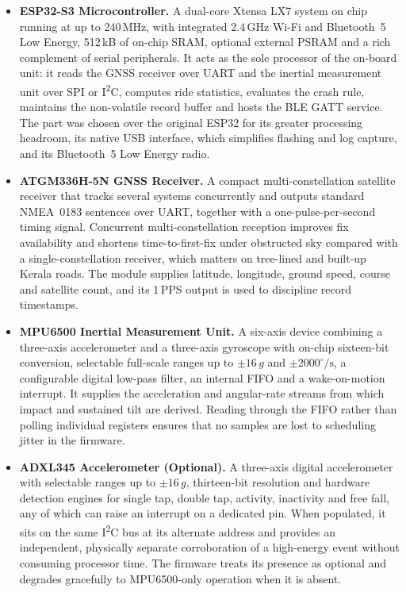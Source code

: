 \documentclass[12pt,a4paper,oneside]{report}
\newcommand{\SI}[2]{#1\,#2}
\begin{document}
\begin{itemize}[leftmargin=*,itemsep=0.6em,topsep=0.6em]
\item \textbf{ESP32-S3 Microcontroller.} A dual-core Xtensa LX7 system on chip running at up
to \SI{240}{MHz}, with integrated \SI{2.4}{GHz} Wi-Fi and Bluetooth~5 Low Energy, \SI{512}{kB}
of on-chip SRAM, optional external PSRAM and a rich complement of serial peripherals. It
acts as the sole processor of the on-board unit: it reads the GNSS receiver over UART and the
inertial measurement unit over SPI or I\textsuperscript{2}C, computes ride statistics,
evaluates the crash rule, maintains the non-volatile record buffer and hosts the BLE GATT
service. The part was chosen over the original ESP32 for its greater processing headroom,
its native USB interface, which simplifies flashing and log capture, and its Bluetooth~5 Low
Energy radio.

\item \textbf{ATGM336H-5N GNSS Receiver.} A compact multi-constellation satellite receiver
that tracks several systems concurrently and outputs standard NMEA~0183 sentences over UART,
together with a one-pulse-per-second timing signal. Concurrent multi-constellation
reception improves fix availability and shortens time-to-first-fix under obstructed sky
compared with a single-constellation receiver, which matters on tree-lined and built-up
Kerala roads. The module supplies latitude, longitude, ground speed, course and satellite
count, and its 1\,PPS output is used to discipline record timestamps.

\item \textbf{MPU6500 Inertial Measurement Unit.} A six-axis device combining a three-axis
accelerometer and a three-axis gyroscope with on-chip sixteen-bit conversion, selectable
full-scale ranges up to $\pm 16\,g$ and $\pm 2000^{\circ}/\mathrm{s}$, a configurable digital
low-pass filter, an internal FIFO and a wake-on-motion interrupt. It supplies the
acceleration and angular-rate streams from which impact and sustained tilt are derived.
Reading through the FIFO rather than polling individual registers ensures that no samples
are lost to scheduling jitter in the firmware.

\item \textbf{ADXL345 Accelerometer (Optional).} A three-axis digital accelerometer with
selectable ranges up to $\pm 16\,g$, thirteen-bit resolution and hardware detection engines
for single tap, double tap, activity, inactivity and free fall, any of which can raise an
interrupt on a dedicated pin. When populated, it sits on the same I\textsuperscript{2}C bus
at its alternate address and provides an independent, physically separate corroboration of a
high-energy event without consuming processor time. The firmware treats its presence as
optional and degrades gracefully to MPU6500-only operation when it is absent.


\end{itemize}
\end{document}
